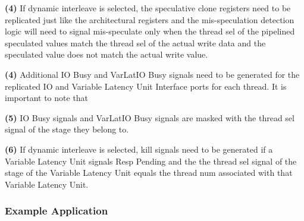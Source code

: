 {\bf (4)} If dynamic interleave is selected, the speculative clone registers need to be replicated just like the architectural registers and the mis-speculation detection logic will need to signal mis-speculate only when the thread sel of the pipelined speculated values match the thread sel of the actual write data and the speculated value does not match the actual write value.

{\bf (4)} Additional IO Busy and VarLatIO Busy signals need to be generated for the replicated IO and Variable Latency Unit Interface ports for each thread. It is important to note that 

{\bf (5)} IO Busy signals and VarLatIO Busy signals are masked with the thread sel signal of the stage they belong to.

{\bf (6)} If dynamic interleave is selected, kill signals need to be generated if a Variable Latency Unit signals Resp Pending and the the thread sel signal of the stage of the Variable Latency Unit equals the thread num associated with that Variable Latency Unit.

\subsubsection{Example Application}
